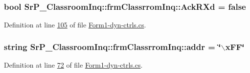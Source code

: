 \hypertarget{class_sr_p___classroom_inq_1_1frm_classrrom_inq_a65b6633a5bc7bff8142fcace6bfba3f8}{
\subsubsection[{\-Ack\-R\-Xd}]{\setlength{\rightskip}{0pt plus 5cm}bool {\bf \-Sr\-P\-\_\-\-Classroom\-Inq\-::frm\-Classrrom\-Inq\-::\-Ack\-R\-Xd} = false}}
\label{class_sr_p___classroom_inq_1_1frm_classrrom_inq_a65b6633a5bc7bff8142fcace6bfba3f8}


\-Definition at line \hyperlink{_form1-dyn-ctrls_8cs_source_l00105}{105} of file \hyperlink{_form1-dyn-ctrls_8cs_source}{\-Form1-\/dyn-\/ctrls.\-cs}.

\hypertarget{class_sr_p___classroom_inq_1_1frm_classrrom_inq_ab99245163109493292f36ab5011c4f76}{
\subsubsection[{addr}]{\setlength{\rightskip}{0pt plus 5cm}string {\bf \-Sr\-P\-\_\-\-Classroom\-Inq\-::frm\-Classrrom\-Inq\-::addr} = \char`\"{}$\backslash$x\-F\-F\char`\"{}}}
\label{class_sr_p___classroom_inq_1_1frm_classrrom_inq_ab99245163109493292f36ab5011c4f76}


\-Definition at line \hyperlink{_form1-dyn-ctrls_8cs_source_l00072}{72} of file \hyperlink{_form1-dyn-ctrls_8cs_source}{\-Form1-\/dyn-\/ctrls.\-cs}.

